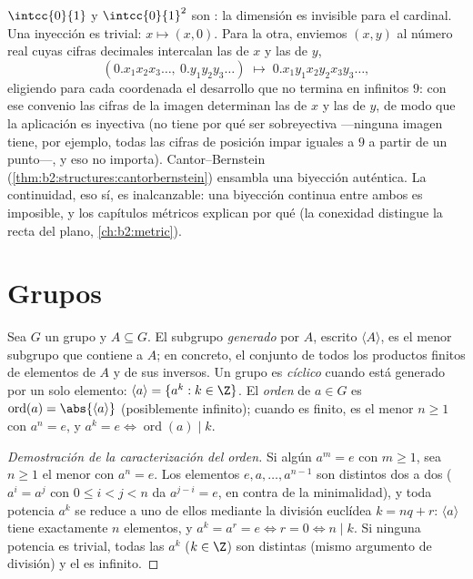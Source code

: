 \begin{example}\label{ex:b2:structures:squareseg}
$\intcc{0}{1}$ y $\intcc{0}{1}^2$ son : la dimensión es
invisible para el cardinal. Una inyección es trivial: $x \mapsto
(x, 0)$. Para la otra, enviemos $(x, y)$ al número real cuyas
cifras decimales intercalan las de $x$ y las de $y$,
\[
(0.x_1x_2x_3\dots,\ 0.y_1y_2y_3\dots)
\;\longmapsto\; 0.x_1y_1x_2y_2x_3y_3\dots,
\]
eligiendo para cada coordenada el desarrollo que no termina en
infinitos $9$: con ese convenio las cifras de la imagen
determinan las de $x$ y las de $y$, de modo que la aplicación es
inyectiva (no tiene por qué ser sobreyectiva ---ninguna imagen
tiene, por ejemplo, todas las cifras de posición impar iguales a
$9$ a partir de un punto---, y eso no importa).
Cantor--Bernstein (\cref{thm:b2:structures:cantorbernstein})
ensambla una biyección auténtica. La continuidad, eso sí, es
inalcanzable: una biyección continua entre ambos es imposible, y
los capítulos métricos explican por qué (la conexidad distingue
la recta del plano, \cref{ch:b2:metric}).
\end{example}

\section{Grupos}

\begin{definition}\label{def:b2:structures:generated}
Sea $G$ un grupo y $A \subseteq G$. El subgrupo \emph{generado} por
$A$, escrito $\langle A \rangle$, es el menor subgrupo que contiene a
$A$; en concreto, el conjunto de todos los productos finitos de
elementos de $A$ y de sus inversos. Un grupo es
\emph{cíclico} cuando está generado por un solo
elemento: $\langle a\rangle = \{a^k : k \in \Z\}$. El
\emph{orden} de $a \in G$ es
$\operatorname{ord}(a) = \abs{\langle a \rangle}$ (posiblemente
infinito); cuando es finito, es el menor $n \geq 1$ con $a^n = e$, y
$a^k = e \iff \operatorname{ord}(a) \mid k$.
\end{definition}

\begin{proof}[Demostración de la caracterización del orden]
Si algún $a^m = e$ con $m \geq 1$, sea $n \geq 1$ el menor con $a^n =
e$. Los elementos $e, a, \dots, a^{n-1}$ son distintos dos a dos
($a^{i} = a^{j}$ con $0 \leq i < j < n$ da $a^{j-i} = e$, en contra
de la minimalidad), y toda potencia $a^k$ se reduce a uno de ellos
mediante la división euclídea $k = nq + r$: $\langle a\rangle$ tiene
exactamente $n$ elementos, y $a^k = a^r = e \iff r = 0 \iff n \mid
k$. Si ninguna potencia es trivial, todas las $a^k$ ($k \in \Z$) son
distintas (mismo argumento de división) y el  es infinito.
\end{proof}

